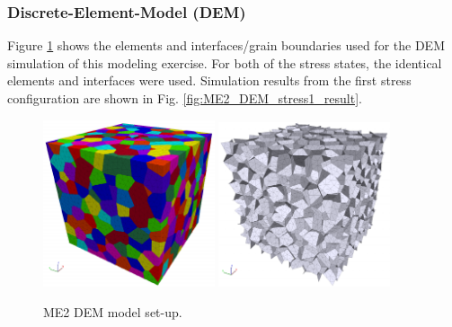 \subsubsection*{Discrete-Element-Model (DEM)}
Figure \ref{fig:ME2_DEM_model_setup} shows the elements and interfaces/grain boundaries used for the DEM simulation of this modeling exercise. For both of the stress states, the identical elements and interfaces were used. Simulation results from the first stress configuration are shown in Fig. \ref{fig:ME2_DEM_stress1_result}.

\begin{figure}[!ht]
\centering
\includegraphics[width=0.45\textwidth]{figures/ME2_DEM_model.pdf}
\includegraphics[width=0.45\textwidth]{figures/ME2_DEM_grain.pdf}
\caption{ME2 DEM model set-up.}
\label{fig:ME2_DEM_model_setup}
\end{figure}

